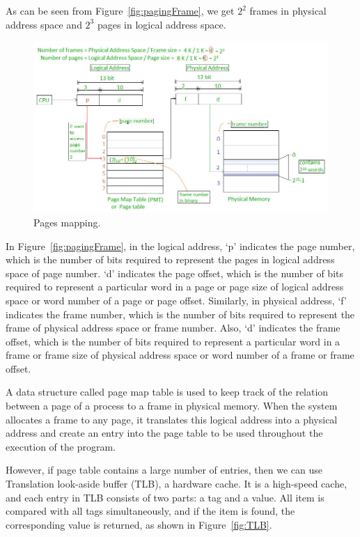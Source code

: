 \documentclass[doc,natbib,12pt]{apa6}
\begin{document}
	As can be seen from Figure~\vref{fig:pagingFrame}, we get $2^2$ frames in physical address space and $2^3$ pages in logical address space.
	
	\begin{figure}[h]
		\centering
		\includegraphics[width=1\textwidth]{pagingFrame.jpg}
		\caption{\label{fig:pagingFrame}Pages mapping. \citep{GeeksforGeeks2018}}
	\end{figure}
	
	In Figure~\vref{fig:pagingFrame},    in the logical address, `p' indicates the page number, which is the number of bits required to represent the pages in logical address space of page number. `d' indicates the page offset, which is the number of bits required to represent a particular word in a page or page size of logical address space or word number of a page or page offset. Similarly, in physical address, `f' indicates the frame number, which is the number of bits required to represent the frame of physical address space or frame number. Also, `d' indicates the frame offset, which is the number of bits required to represent a particular word in a frame or frame size of physical address space or word number of a frame or frame offset.
	
	A data structure called page map table is used to keep track of the relation between a page of a process to a frame in physical memory. When the system allocates a frame to any page, it translates this logical
	address into a physical address and create an entry into the page table to be
	used throughout the execution of the program.
	
	However, if page table contains a large number of entries, then we can use Translation look-aside buffer (TLB), a hardware cache. It is a high-speed cache, and each entry in TLB consists of two parts: a tag and a value. All item is compared with all tags simultaneously, and if the item is found, the corresponding value is returned, as shown in Figure~\vref{fig:TLB}.
	
\end{document}
